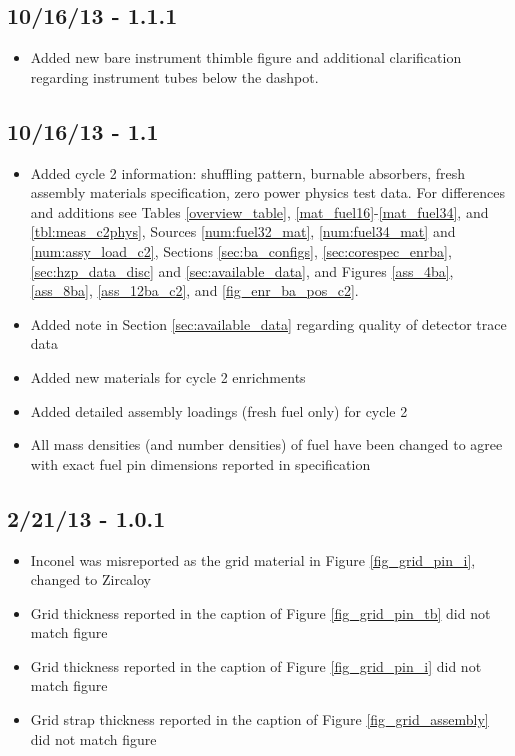 \subsection*{10/16/13 - 1.1.1}
\begin{itemize}
  \item Added new bare instrument thimble figure and additional clarification
  regarding instrument tubes below the dashpot.
\end{itemize}

\subsection*{10/16/13 - 1.1}
\begin{itemize}
  \item Added cycle 2 information: shuffling pattern, burnable absorbers, fresh
    assembly materials specification, zero power physics test data. For
    differences and additions see Tables \ref{overview_table},
    \ref{mat_fuel16}-\ref{mat_fuel34}, and \ref{tbl:meas_c2phys}, Sources
    \ref{num:fuel32_mat}, \ref{num:fuel34_mat} and \ref{num:assy_load_c2},
    Sections \ref{sec:ba_configs}, \ref{sec:corespec_enrba},
    \ref{sec:hzp_data_disc} and \ref{sec:available_data}, and Figures
    \ref{ass_4ba}, \ref{ass_8ba}, \ref{ass_12ba_c2}, and
    \ref{fig_enr_ba_pos_c2}.
  \item Added note in Section \ref{sec:available_data} regarding quality of
  detector trace data
  \item Added new materials for cycle 2 enrichments
  \item Added detailed assembly loadings (fresh fuel only) for cycle 2
  \item All mass densities (and number densities) of fuel have been changed to
        agree with exact fuel pin dimensions reported in specification
\end{itemize}

\subsection*{2/21/13 - 1.0.1}
\begin{itemize}
  \item Inconel was misreported as the grid material in Figure \ref{fig_grid_pin_i}, changed to Zircaloy
  \item Grid thickness reported in the caption of Figure \ref{fig_grid_pin_tb} did not match figure
  \item Grid thickness reported in the caption of Figure \ref{fig_grid_pin_i} did not match figure
  \item Grid strap thickness reported in the caption of Figure \ref{fig_grid_assembly} did not match figure
\end{itemize}


